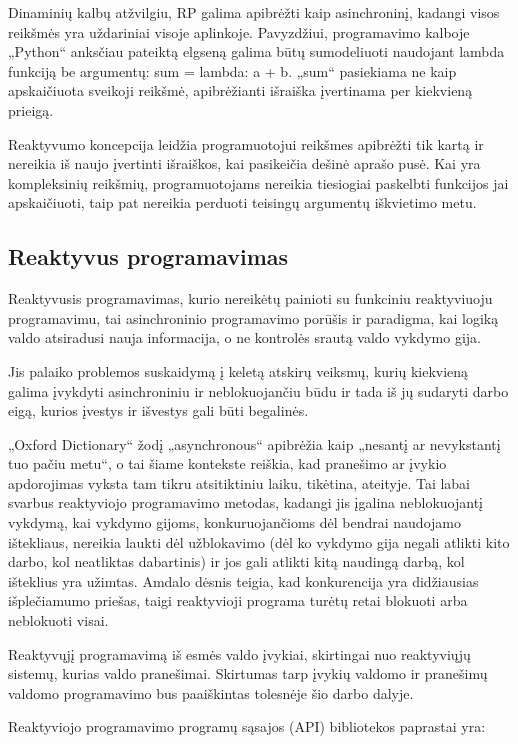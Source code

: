 Dinaminių kalbų atžvilgiu, RP galima apibrėžti kaip asinchroninį, kadangi visos reikšmės yra uždariniai visoje aplinkoje. Pavyzdžiui, programavimo kalboje „Python“ anksčiau pateiktą elgseną galima būtų sumodeliuoti naudojant lambda funkciją be argumentų: sum = lambda: a + b. „sum“ pasiekiama ne kaip apskaičiuota sveikoji reikšmė, apibrėžianti išraiška įvertinama per kiekvieną prieigą.

Reaktyvumo koncepcija leidžia programuotojui reikšmes apibrėžti tik kartą ir nereikia iš naujo įvertinti išraiškos, kai pasikeičia dešinė aprašo pusė. Kai yra kompleksinių reikšmių, programuotojams nereikia tiesiogiai paskelbti funkcijos jai apskaičiuoti, taip pat nereikia perduoti teisingų argumentų iškvietimo metu.

\subsection{Reaktyvus programavimas}

Reaktyvusis programavimas, kurio nereikėtų painioti su funkciniu reaktyviuoju programavimu, tai asinchroninio programavimo porūšis ir paradigma, kai logiką valdo atsiradusi nauja informacija, o ne kontrolės srautą valdo vykdymo gija.

Jis palaiko problemos suskaidymą į keletą atskirų veiksmų, kurių kiekvieną galima įvykdyti asinchroniniu ir neblokuojančiu būdu ir tada iš jų sudaryti darbo eigą, kurios įvestys ir išvestys gali būti begalinės.

„Oxford Dictionary“ žodį „asynchronous“ apibrėžia kaip „nesantį ar nevykstantį tuo pačiu metu“, o tai šiame kontekste reiškia, kad pranešimo ar įvykio apdorojimas vyksta tam tikru atsitiktiniu laiku, tikėtina, ateityje. Tai labai svarbus reaktyviojo programavimo metodas, kadangi jis įgalina neblokuojantį vykdymą, kai vykdymo gijoms, konkuruojančioms dėl bendrai naudojamo ištekliaus, nereikia laukti dėl užblokavimo (dėl ko vykdymo gija negali atlikti kito darbo, kol neatliktas dabartinis) ir jos gali atlikti kitą naudingą darbą, kol išteklius yra užimtas. Amdalo dėsnis teigia, kad konkurencija yra didžiausias išplečiamumo priešas, taigi reaktyvioji programa turėtų retai blokuoti arba neblokuoti visai.

Reaktyvųjį programavimą iš esmės valdo įvykiai, skirtingai nuo reaktyviųjų sistemų, kurias valdo pranešimai. Skirtumas tarp įvykių valdomo ir pranešimų valdomo programavimo bus paaiškintas tolesnėje šio darbo dalyje.

Reaktyviojo programavimo programų sąsajos (API) bibliotekos paprastai yra:

